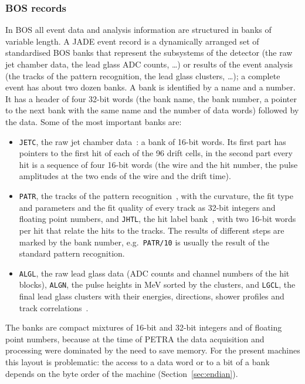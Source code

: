 \subsubsection{BOS records}
In BOS all event data and analysis information are structured in banks of variable length. A JADE event record is a
dynamically arranged set of standardised BOS banks that represent the subsystems of the detector (the raw jet chamber data,
the lead glass ADC counts, \dots) or results of the event analysis (the tracks of the pattern recognition, the lead glass
clusters, \dots); a complete event has about two dozen banks. A bank is identified by a name and a number. It has a header
of four 32-bit words (the bank name, the bank number, a pointer to the next bank with the same name and the number of data
words) followed by the data. Some of the most important banks are:
\begin{itemize}
\item \texttt{JETC}, the raw jet chamber data~\cite{JCN:23}: a bank of 16-bit words. Its first part has pointers to the first
hit of each of the 96 drift cells, in the second part every hit is a sequence of four 16-bit words (the wire and the hit number,
the pulse amplitudes at the two ends of the wire and the drift time).
\item \texttt{PATR}, the tracks of the pattern recognition~\cite{JCN:12}, with the curvature, the fit type and parameters and the
fit quality of every track as 32-bit integers and floating point numbers, and \texttt{JHTL}, the hit label bank~\cite{JCN:21},
with two 16-bit words per hit that relate the hits to the tracks. The results of different steps are marked by the bank number,
e.g.\ \texttt{PATR/10} is usually the result of the standard pattern recognition.
\item \texttt{ALGL}, the raw lead glass data (ADC counts and channel numbers of the hit blocks), \texttt{ALGN}, the pulse heights
in MeV sorted by the clusters, and \texttt{LGCL}, the final lead glass clusters with their energies, directions, shower profiles
and track correlations~\cite{JCN:14D}.
\end{itemize}
The banks are compact mixtures of 16-bit and 32-bit integers and of floating point numbers, because at the time of PETRA
the data acquisition and processing were dominated by the need to save memory. For the present machines this layout is
problematic: the access to a data word or to a bit of a bank depends on the byte order of the machine (Section~\ref{sec:endian}).

